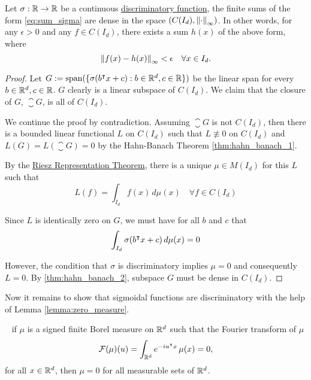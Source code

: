 \begin{theorem}
    Let $\sigma: \mathbb{R} \to \mathbb{R}$ be a
    continuous \hyperref[def:dis_func]{discriminatory function}, the finite sums
    of the form \eqref{eq:sum_sigma} are dense in the space $(C(I_d),
    \left\| \cdot \right\|_{\infty})$. In other words, for any $\epsilon > 0$ and any
    $f \in C(I_d)$, there exists a sum $h(x)$ of the above form, where
    \begin{equation}
        \left\| f(x) - h(x) \right\|_{\infty} < \epsilon \quad \forall x \in I_d.
    \end{equation}
\end{theorem}

\begin{proof}
    Let $G := \operatorname{span}(\{\sigma(b{}^{\intercal} x + c): b \in \mathbb{R}^d, c \in \mathbb{R} \})$ be the linear
    span for every $b\in\mathbb{R}^d, c\in\mathbb{R}$. $G$ clearly is a linear subspace of
    $C(I_d)$. We claim that the closure of $G$, $\closure{G}$, is all of
    $C(I_d)$.

    We continue the proof by contradiction. Assuming $\closure{G}$ is not
    $C(I_d)$, then there is a bounded linear functional $L$ on $C(I_d)$ such
    that $L \not\equiv 0$ on $C(I_d)$ and $L(G) = L(\closure{G}) = 0$ by the
    Hahn-Banach Theorem \ref{thm:hahn_banach_1}.

    By the \hyperref[thm:riesz_rep]{Riesz Representation Theorem}, there is a
    unique $\mu \in M(I_d)$ for this $L$ such that
    \begin{equation}
        L(f) = \int_{I_d} f(x) \,d\mu(x) \quad \forall f \in C(I_d)
    \end{equation}

    Since $L$ is identically zero on $G$, we must have for all $b$ and $c$ that
    \begin{equation}
        \int_{I_d} \sigma(b{}^{\intercal} x + c) \,d\mu(x) = 0
    \end{equation}

    However, the condition that $\sigma$ is discriminatory implies $\mu = 0$ and
    consequently $L = 0$. By \eqref{thm:hahn_banach_2}, subspace $G$ must be
    dense in $C(I_d)$.
\end{proof}

Now it remains to show that sigmoidal functions are discriminatory with the help
of Lemma \ref{lemma:zero_measure}.

\begin{lemma}~\cite{rudinFunctionalAnalysis1991}
    \label{lemma:zero_measure}
    if $\mu$ is a signed finite Borel measure on $\mathbb{R}^d$ such that the Fourier
    transform of $\mu$
    \begin{equation}
        \mathcal{F}(\mu)(u) = \int_{\mathbb{R}^d} e^{-iu{}^{\intercal} x} \,\mu(x) = 0,  
    \end{equation}
    for all $x\in\mathbb{R}^d$, then $\mu = 0$ for all measurable sets of $\mathbb{R}^d$.
\end{lemma}

